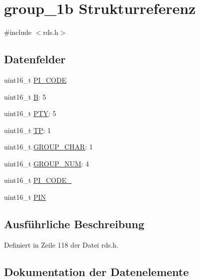 \hypertarget{structgroup__1b}{}\section{group\+\_\+1b Strukturreferenz}
\label{structgroup__1b}


{\ttfamily \#include $<$rds.\+h$>$}

\subsection*{Datenfelder}
\begin{DoxyCompactItemize}
\item 
uint16\+\_\+t \hyperlink{structgroup__1b_a5cd9b1f6413028425796c1129aa8fd87}{P\+I\+\_\+\+C\+O\+D\+E}
\item 
uint16\+\_\+t \hyperlink{structgroup__1b_ae783bd90764c8455228772c025c064e4}{B}\+: 5
\item 
uint16\+\_\+t \hyperlink{structgroup__1b_a0474967478fbbc2c71b800d2e0132d45}{P\+T\+Y}\+: 5
\item 
uint16\+\_\+t \hyperlink{structgroup__1b_ab9e634c63b0d95a96716d5f6d7f06d72}{T\+P}\+: 1
\item 
uint16\+\_\+t \hyperlink{structgroup__1b_a66d4119990dc4c3e040a43885e9bb953}{G\+R\+O\+U\+P\+\_\+\+C\+H\+A\+R}\+: 1
\item 
uint16\+\_\+t \hyperlink{structgroup__1b_a9f692e9f76ee88348d426bcd4e9bc70b}{G\+R\+O\+U\+P\+\_\+\+N\+U\+M}\+: 4
\item 
uint16\+\_\+t \hyperlink{structgroup__1b_ae86fed9d07832a5c3cc36d5aaa064bcb}{P\+I\+\_\+\+C\+O\+D\+E\+\_}
\item 
uint16\+\_\+t \hyperlink{structgroup__1b_a23b9db30b873d9b45f435df66328a784}{P\+I\+N}
\end{DoxyCompactItemize}


\subsection{Ausführliche Beschreibung}


Definiert in Zeile 118 der Datei rds.\+h.



\subsection{Dokumentation der Datenelemente}
\hypertarget{structgroup__1b_ae783bd90764c8455228772c025c064e4}{}
